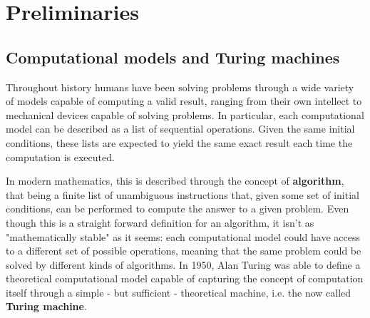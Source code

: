 
\chapter{Preliminaries} \label{chap:preliminaries}

\section{Computational models and Turing machines}

Throughout history humans have been solving problems through a wide variety of models capable of computing a valid result, ranging from their own intellect to mechanical devices capable of solving problems. In particular, each computational model can be described as a list of sequential operations. Given the same initial conditions, these lists are expected to yield the same exact result each time the computation is executed.

In modern mathematics, this is described through the concept of \textbf{algorithm}, that being a finite list of unambiguous instructions that, given some set of initial conditions, can be performed to compute the answer to a given problem. Even though this is a straight forward definition for an algorithm, it isn't as "mathematically stable" as it seems: each computational model could have access to a different set of possible operations, meaning that the same problem could be solved by different kinds of algorithms. In 1950, Alan Turing was able to define a theoretical computational model capable of capturing the concept of computation itself through a simple - but sufficient - theoretical machine, i.e. the now called \textbf{Turing machine}.  \cite{complexity_arora_barak, sipser_computation}

